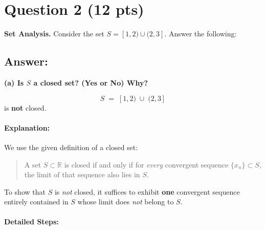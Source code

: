 \documentclass[12pt]{article}
\begin{document}
\newpage

\section*{Question 2 (12 pts)}
\textbf{Set Analysis.} Consider the set \(S = [1, 2) \cup (2, 3]\). Answer the following:

\subsection*{Answer:}

\noindent \textbf{(a) Is \(S\) a closed set? (Yes or No) Why?}

\[
S \;=\; [1,2) \;\cup\; (2,3]
\]
is \textbf{not} closed.

\paragraph{Explanation:}

We use the given definition of a closed set:

\begin{quote}
A set \( S \subset \mathbb{R} \) is closed if and only if for \textit{every} convergent sequence \( \{x_n\} \subset S \), the limit of that sequence also lies in \( S \).
\end{quote}

To show that \( S \) is \textit{not} closed, it suffices to exhibit \textbf{one} convergent sequence entirely contained in \( S \) whose limit does \textit{not} belong to \( S \).

\paragraph{Detailed Steps:}
\end{document}
